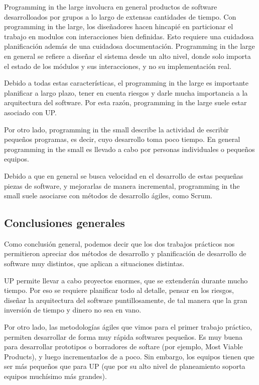 Programming in the large involucra en general productos de software desarrolloados por grupos a lo largo de extensas cantidades de tiempo. Con programming in the large, los diseñadores hacen hincapié en particionar el trabajo en modulos con interacciones bien definidas. Esto requiere una cuidadosa planificación además de una cuidadosa documentación. Programming in the large en general se refiere a diseñar el sistema desde un alto nivel, donde solo importa el estado de los módulos y sus interacciones, y no su implementación real.

Debido a todas estas características, el programming in the large es importante planificar a largo plazo, tener en cuenta riesgos y darle mucha importancia a la arquitectura del software. Por esta razón, programming in the large suele estar asociado con UP.

Por otro lado, programming in the small describe la actividad de escribir pequeños programas, es decir, cuyo desarrollo toma poco tiempo. En general programming in the small es llevado a cabo por personas individuales o pequeños equipos.

Debido a que en general se busca velocidad en el desarrollo de estas pequeñas piezas de software, y mejorarlas de manera incremental, programming in the small suele asociarse con métodos de desarrollo ágiles, como Scrum.

\subsection{Conclusiones generales}

Como conclusión general, podemos decir que los dos trabajos prácticos nos permitieron apreciar dos m\'etodos de desarrollo y planificación de desarrollo de software muy distintos, que aplican a situaciones distintas. 

UP permite llevar a cabo proyectos enormes, que se extenderán durante mucho tiempo. Por eso se requiere planificar todo al detalle, pensar en los riesgos, diseñar la arquitectura del software puntillosamente, de tal manera que la gran inversión de tiempo y dinero no sea en vano.

Por otro lado, las metodologías ágiles que vimos para el primer trabajo práctico, permiten desarrollar de forma muy rápida softwares pequeños. Es muy buena para desarrollar prototipos o borradores de softare (por ejemplo, Most Viable Products), y luego incrementarlos de a poco. Sin embargo, los equipos tienen que ser más pequeños que para UP (que por su alto nivel de planeamiento soporta equipos muchísimo más grandes).
